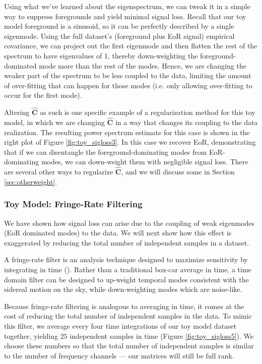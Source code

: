 \documentclass[preprint2,numberedappendix,tighten]{aastex6}  %
\newcommand{\cc}[1]{{\color{purple} \textbf{[CC: #1]}}}
\begin{document}
Using what we've learned about the eigenspectrum, we can tweak it in a simple way to suppress foregrounds and yield minimal 
signal loss. Recall that our toy model foreground is a sinusoid, so it can be perfectly described by a single eigenmode. Using the full dataset's (foreground plus EoR signal) empirical covariance, we can 
project out the first eigenmode and then flatten the rest of the spectrum to have eigenvalues of 1, thereby down-weighting the foreground-dominated mode more than the rest of the modes. Hence, we are changing the weaker part of the spectrum to be less coupled to the data, limiting the amount of over-fitting that can happen for those modes (i.e. only allowing over-fitting to occur for the first mode).

Altering $\widehat{\textbf{C}}$ as such is one specific example of a regularization method for this toy model, in which we are 
changing $\widehat{\textbf{C}}$ in a way that changes its coupling to the data realization. The resulting 
power spectrum estimate for this case is shown in the right plot of Figure \ref{fig:toy_sigloss3}. In this case we recover EoR, 
demonstrating that if we can disentangle the foreground-dominating modes from EoR-dominating modes, we can down-weight 
them with negligible signal loss. There are several other ways to regularize $\widehat{\textbf{C}}$, and we will discuss some in Section 
\ref{sec:otherweight}.

\subsubsection{Toy Model: Fringe-Rate Filtering}
\label{sec:toymodel_frf}

We have shown how signal loss can arise due to the coupling of weak eigenmodes (EoR dominated modes) to the data. We will next show how this effect is exaggerated by reducing the total number of independent 
samples in a dataset. 

A fringe-rate filter is an analysis technique designed to maximize sensitivity by integrating in time (\citealt{parsons_et_al2016}). 
Rather than a traditional box-car average in time, a time domain filter can be designed to up-weight temporal modes consistent with 
the sidereal motion on the sky, while down-weighting modes which are noise-like. 

Because fringe-rate filtering is analogous to averaging in time, it comes at the cost of reducing the total number of independent 
samples in the data. To mimic this filter, we average every four time integrations of our toy model dataset together, yielding 
$25$ independent samples in time (Figure \ref{fig:toy_sigloss5}). We choose these numbers so that the total number of 
independent samples is similar to the number of frequency channels --- our matrices will still be full rank.
\end{document}
